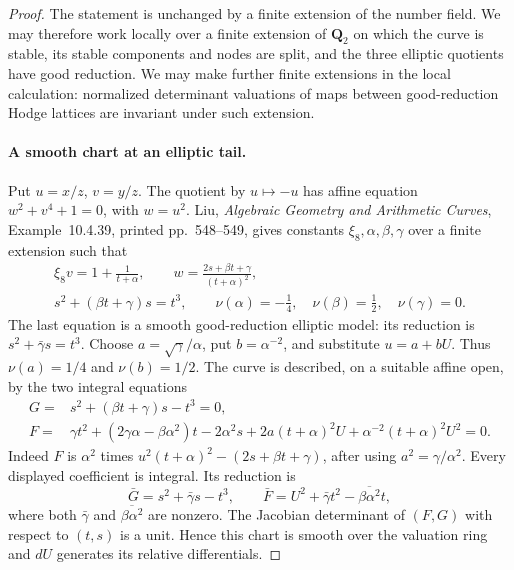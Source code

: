 \begin{proof}
The statement is unchanged by a finite extension of the number field.
We may therefore work locally over a finite extension of $\mathbf Q_2$
on which the curve is stable, its stable components and nodes are split,
and the three elliptic quotients have good reduction. We may make
further finite extensions in the local calculation: normalized
determinant valuations of maps between good-reduction Hodge lattices
are invariant under such extension.

\paragraph{A smooth chart at an elliptic tail.}
Put $u=x/z$, $v=y/z$. The quotient by $u\mapsto-u$ has affine
equation $w^2+v^4+1=0$, with $w=u^2$.
Liu, \emph{Algebraic Geometry and Arithmetic Curves},
Example~10.4.39, printed pp.~548--549, gives constants
$\xi_8,\alpha,\beta,\gamma$ over a finite extension such that
\[
 \begin{gathered}
 \xi_8v=1+\frac1{t+\alpha},\qquad
 w=\frac{2s+\beta t+\gamma}{(t+\alpha)^2},\\
 s^2+(\beta t+\gamma)s=t^3,\qquad
 \nu(\alpha)=-\frac14,\quad
 \nu(\beta)=\frac12,\quad \nu(\gamma)=0.
                                                        \tag{JAC.P10.2}
 \end{gathered}
\]
The last equation is a smooth good-reduction elliptic model: its
reduction is $s^2+\bar\gamma s=t^3$.
Choose $a=\sqrt\gamma/\alpha$, put $b=\alpha^{-2}$, and substitute
$u=a+bU$. Thus $\nu(a)=1/4$ and $\nu(b)=1/2$.
The curve is described, on a suitable affine open, by the two
integral equations
\[
 \begin{split}
 G={}&s^2+(\beta t+\gamma)s-t^3=0,\\
 F={}&\gamma t^2+(2\gamma\alpha-\beta\alpha^2)t
       -2\alpha^2s
       +2a(t+\alpha)^2U
       +\alpha^{-2}(t+\alpha)^2U^2=0.
 \end{split}                                             \tag{JAC.P10.3}
\]
Indeed $F$ is $\alpha^2$ times
$u^2(t+\alpha)^2-(2s+\beta t+\gamma)$, after using
$a^2=\gamma/\alpha^2$. Every displayed coefficient is integral.
Its reduction is
\[
 \bar G=s^2+\bar\gamma s-t^3,
 \qquad
 \bar F=U^2+\bar\gamma t^2-\overline{\beta\alpha^2}t,
                                                        \tag{JAC.P10.4}
\]
where both $\bar\gamma$ and $\overline{\beta\alpha^2}$ are nonzero.
The Jacobian determinant of $(F,G)$ with respect to $(t,s)$ is a
unit. Hence this chart is smooth over the valuation ring and $dU$
generates its relative differentials.


\end{proof}
